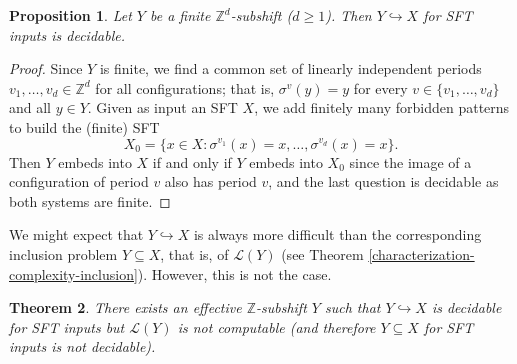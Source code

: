 \documentclass[a4paper]{article}
\newcommand{\Le}{\mathcal{L}}
\newcommand{\Z}{\mathbb{Z}}
\newtheorem{theorem}{Theorem}[section]
\newtheorem{proposition}[theorem]{Proposition}
\theoremstyle{definition}
\begin{document}
\begin{proposition}\label{embedding-decidable-finite-subshifts}
Let $Y$ be a finite $\mathbb{Z}^d$-subshift ($d\geq 1$). Then $Y \hookrightarrow X$ for SFT inputs is decidable.
\end{proposition}
\begin{proof}
Since $Y$ is finite, we find a common set of linearly independent periods $v_1,\dots,v_d\in\mathbb{Z}^d$ for all configurations; that is, $\sigma^v(y)=y$ for every $v\in \{ v_1,\dots,v_d\}$ and all $y\in Y$. Given as input an SFT $X$, we add finitely many forbidden patterns to build the (finite) SFT 
\[X_0=\{x\in X : \sigma^{v_1}(x)=x,\dots,\sigma^{v_d}(x)=x\}.\]Then $Y$ embeds into $X$ if and only if $Y$ embeds into $X_0$ since the image of a configuration of period $v$ also has period $v$, and the last question is decidable as both systems are finite.
\end{proof}

We might expect that $Y \hookrightarrow X$ is always more difficult than the corresponding inclusion problem $Y \subseteq X$, that is, of $\Le(Y)$ (see Theorem \ref{characterization-complexity-inclusion}). However, this is not the case.

\begin{theorem}\label{answer1}
There exists an effective $\Z$-subshift $Y$ such that $Y \hookrightarrow X$ is decidable for SFT inputs but $\Le(Y)$ is not computable (and therefore $Y\subseteq X$ for SFT inputs is not decidable).
\end{theorem}
\end{document}
